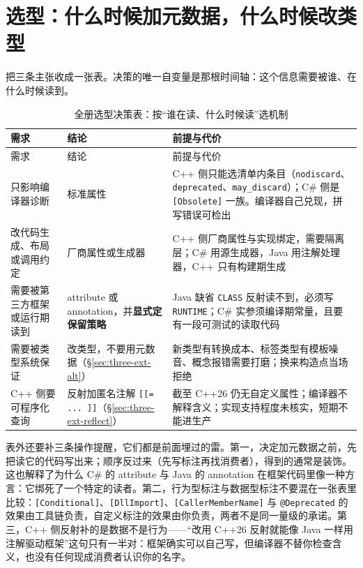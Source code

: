 \documentclass[12pt,a4paper,fontset=fandol]{ctexbook}
\newcommand{\cpp}[1]{C++#1}
\begin{document}
\section{选型：什么时候加元数据，什么时候改类型}
\label{sec:three-pick}

把三条主张收成一张表。决策的唯一自变量是那根时间轴：这个信息需要被谁、在什么时候读到。

{\footnotesize
\begin{longtable}{@{}>{\raggedright\arraybackslash}p{}>{\raggedright\arraybackslash}p{}>{\raggedright\arraybackslash}p{}@{}}
\caption{全册选型决策表：按“谁在读、什么时候读”选机制}\label{tab:ch3-pick}\\
\toprule
需求 & 结论 & 前提与代价 \\
\midrule
\endfirsthead
\toprule
需求 & 结论 & 前提与代价 \\
\midrule
\endhead
\bottomrule
\endfoot
只影响编译器诊断 & 标准属性 & \cpp{} 侧只能选清单内条目（\texttt{nodiscard}、\texttt{deprecated}、\texttt{may\_discard}）；C\# 侧是 \texttt{[Obsolete]} 一族。编译器自己兑现，拼写错误可检出 \\
改代码生成、布局或调用约定 & 厂商属性或生成器 & \cpp{} 侧厂商属性与实现绑定，需要隔离层；C\# 用源生成器，Java 用注解处理器，\cpp{} 只有构建期生成 \\
需要被第三方框架或运行期读到 & attribute 或 annotation，并\textbf{显式定保留策略} & Java 缺省 \texttt{CLASS} 反射读不到，必须写 \texttt{RUNTIME}；C\# 实参须编译期常量，且要有一段可测试的读取代码 \\
需要被类型系统保证 & 改类型，不要用元数据（\S\ref{sec:three-ext-alt}） & 新类型有转换成本、标签类型有模板噪音、概念报错需要打磨；换来构造点当场拒绝 \\
\cpp{} 侧要可程序化查询 & 反射加匿名注解 \texttt{[[= ... ]]}（\S\ref{sec:three-ext-reflect}） & 截至 \cpp{26} 仍无自定义属性；编译器不解释含义；实现支持程度未核实，短期不能进生产 \\
\end{longtable}}

表外还要补三条操作提醒，它们都是前面埋过的雷。第一，决定加元数据之前，先把读它的代码写出来；顺序反过来（先写标注再找消费者），得到的通常是装饰。这也解释了为什么 C\# 的 attribute 与 Java 的 annotation 在框架代码里像一种方言：它绑死了一个特定的读者。第二，行为型标注与数据型标注不要混在一张表里比较：\texttt{[Conditional]}、\texttt{[DllImport]}、\texttt{[CallerMemberName]} 与 \texttt{@Deprecated} 的效果由工具链负责，自定义标注的效果由你负责，两者不是同一量级的承诺。第三，\cpp{} 侧反射补的是数据不是行为——“改用 \cpp{26} 反射就能像 Java 一样用注解驱动框架”这句只有一半对：框架确实可以自己写，但编译器不替你检查含义，也没有任何现成消费者认识你的名字。
\end{document}
